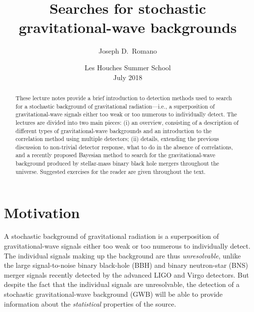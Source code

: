 \documentclass[11pt]{article}
\numberwithin{equation}{section}
\begin{document}
\title{Searches for stochastic gravitational-wave backgrounds}
\author{Joseph D.\ Romano}
\date{Les Houches Summer School\\
July 2018}

\maketitle

\begin{abstract}
These lecture notes provide a brief introduction 
to detection methods used to search for a stochastic 
background of gravitational radiation---i.e., a 
superposition of gravitational-wave signals either too weak 
or too numerous to individually detect.
The lectures are divided into two main pieces:
(i) an overview, consisting of a description of different 
types of gravitational-wave backgrounds and an introduction 
to the correlation method using multiple detectors;
(ii) details, extending the previous discussion to 
non-trivial detector response, what to do in the absence
of correlations, and a recently proposed Bayesian method 
to search for the gravitational-wave background produced 
by stellar-mass binary black hole mergers throughout the 
universe.
Suggested exercises for the reader are given throughout 
the text.
\end{abstract}

\pagebreak
\tableofcontents
\pagebreak


\section{Motivation}

A stochastic background of gravitational radiation 
is a superposition of gravitational-wave signals either 
too weak or too numerous to individually detect.
The individual signals making up the background are thus
{\em unresolvable}, unlike the large signal-to-noise 
binary black-hole (BBH) and binary neutron-star (BNS)
merger signals recently detected by the advanced LIGO 
and Virgo detectors.
But despite the fact that the individual signals are 
unresolvable, the detection of a stochastic 
gravitational-wave background (GWB) will 
be able to provide information about the 
{\em statistical} properties of the source.
\end{document}
